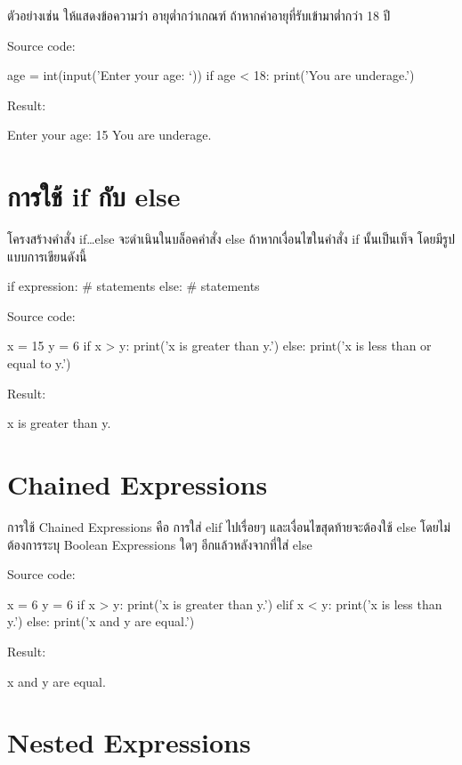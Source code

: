 ตัวอย่างเช่น ให้แสดงข้อความว่า อายุต่ำกว่าเกณฑ์ ถ้าหากค่าอายุที่รับเข้ามาต่ำกว่า 18 ปี

Source code:
\begin{pycode}
age = int(input('Enter your age: `))
if age < 18:
   print('You are underage.')
\end{pycode}

Result:
\begin{pycode}
Enter your age: 15
You are underage.
\end{pycode}


\section{การใช้ if กับ else}

โครงสร้างคำสั่ง if…else จะดำเนินในบล็อคคำสั่ง else ถ้าหากเงื่อนไขในคำสั่ง if นั้นเป็นเท็จ โดยมีรูปแบบการเขียนดังนี้

\begin{pycode}
if expression:
    # statements
else:
    # statements
\end{pycode}

Source code:
\begin{pycode}
x = 15
y = 6
if x > y: print('x is greater than y.')
else: print('x is less than or equal to y.')
\end{pycode}

Result:
\begin{pycode}
x is greater than y.
\end{pycode}


\section{Chained Expressions}

การใช้ Chained Expressions คือ การใส่ elif ไปเรื่อยๆ และเงื่อนไขสุดท้ายจะต้องใช้ else โดยไม่ต้องการระบุ Boolean Expressions ใดๆ อีกแล้วหลังจากที่ใส่ else

Source code:
\begin{pycode}
x = 6
y = 6
if x > y: print('x is greater than y.')
elif x < y: print('x is less than y.')
else: print('x and y are equal.')
\end{pycode}

Result:
\begin{pycode}
x and y are equal.
\end{pycode}


\section{Nested Expressions}

